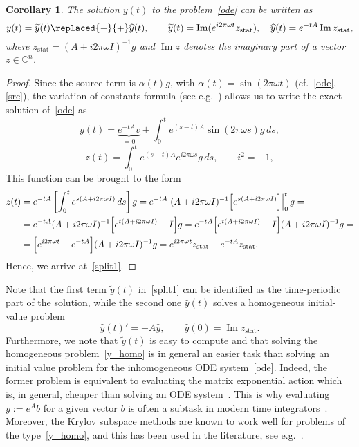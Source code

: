 \documentclass[11pt]{elsarticle}
\newcommand{\Cc}{\mathbb{C}}
\renewcommand{\Im}{\mathop{\mathrm{Im}}}
\newcommand{\yh}{\widehat{y}}
\newcommand{\yt}{\widetilde{y}}
\newcommand{\zstat}{z_{\mathrm{stat}}}
\newtheorem{coroll}{Corollary}
\begin{document}
\begin{coroll}
The solution $y(t)$ to the problem~\eqref{ode} can be written
as 
\begin{equation}
\label{split1}  
y(t) = \yt(t)\replaced{-}{+} \yh(t), \qquad 
\yt(t)=\Im(e^{i2\pi\omega t}\zstat),\quad \yh(t)=e^{-tA} \Im\zstat,
\end{equation}
where $\zstat = (A+i2\pi\omega I)^{-1}g$
and $\Im z$ denotes the imaginary part of a vector $z\in\Cc^n$.
\end{coroll}

\begin{proof}
Since the source term is $\alpha(t)g$, with $\alpha(t) = \sin(2\pi\omega t)$
(cf.~\eqref{ode},\eqref{src}), the variation of constants formula (see 
e.g.~\cite{HundsdorferVerwer:book}) allows us to write  
the exact solution of~\eqref{ode} as 
$$
y(t) = \underbrace{e^{-tA}v}_{=0}{} + \int_0^t e^{(s-t)A}\sin(2\pi\omega s) g\, ds,
$$
$$
z(t) = \int_0^t e^{(s-t)A}e^{i2\pi\omega s} g\, ds, \qquad i^2 = -1,
$$ 
\added{introduced in such a way that $y(t)=\Im z(t)$.}
This function can be brought to the form
$$\begin{aligned}
z(t) &= e^{-tA} \left[\int_0^t e^{s(A+i2\pi\omega I)} \, ds \right] g =
e^{-tA} \left. (A+i2\pi\omega I)^{-1} \Bigl[e^{s(A+i2\pi\omega I)} 
\Bigr]\right|_0^t g =
\\
&= e^{-tA} (A+i2\pi\omega I)^{-1} \Bigl[e^{t(A+i2\pi\omega I)}-I \Bigr] g =
e^{-tA} \Bigl[e^{t(A+i2\pi\omega I)}-I \Bigr] (A+i2\pi\omega I)^{-1}g =
\\
&= \Bigl[e^{i2\pi\omega t}-e^{-tA} \Bigr] (A+i2\pi\omega I)^{-1}g =
e^{i2\pi\omega t}\zstat - e^{-tA}\zstat.
\end{aligned}$$
Hence, we arrive at~\eqref{split1}.
\end{proof}

Note that
the first term $\yt(t)$ in~\eqref{split1} can be identified
as the time-periodic part of the solution, while the second one
$\yh(t)$ solves a homogeneous initial-value problem 
\begin{equation}
\label{y_homo}
\yh(t)' = -A\yh, \qquad \yh(0) = \Im\zstat.  
\end{equation}
Furthermore, we note that $\yt(t)$ is easy to compute and that 
solving the homogeneous problem~\eqref{y_homo} is in general an
easier task than solving an initial value problem for 
the inhomogeneous ODE system~\eqref{ode}.  
Indeed, the former problem is equivalent to evaluating the matrix exponential 
action which is, in general, cheaper than solving an ODE system~\cite{19ways}.
This is why evaluating $y:=e^{A}b$ for a given vector $b$ is often a subtask
in modern time integrators~\cite{HochbruckOstermann2010}.
Moreover, the Krylov subspace methods are known to work
well for problems of the type~\eqref{y_homo}, and this has been
used in the literature, see e.g.~\cite{PARAEXP}.
\end{document}

